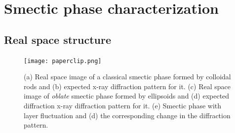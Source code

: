 \documentclass[aip,graphicx]{revtex4-1} %
\begin{document}
\section{Smectic phase characterization}

\subsection{Real space structure}

\begin{figure}[]
\centering
\texttt{[image: paperclip.png]}
\caption{(a) Real space image of a classical smectic phase formed by colloidal rods and (b) expected x-ray diffraction pattern for it. (c) Real space image of \textit{oblate} smectic phase formed by ellipsoids and (d) expected diffraction x-ray diffraction pattern for it. (e) Smectic phase with layer fluctuation and (d) the corresponding change in the diffraction pattern.}\label{paperclip}
\end{figure}

\end{document}
